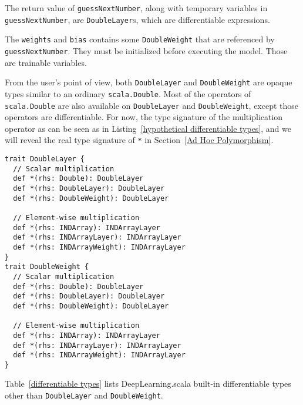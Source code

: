 The return value of \lstinline{guessNextNumber}, along with temporary variables in \lstinline{guessNextNumber}, are \lstinline{DoubleLayer}s, which are \glspl{differentiable expression}.

The \lstinline{weights} and \lstinline{bias} contains some \lstinline{DoubleWeight} that are referenced by \lstinline{guessNextNumber}.
They must be initialized before executing the model. Those are \glspl{trainable variable}.

From the user's point of view, both \lstinline{DoubleLayer} and \lstinline{DoubleWeight} are opaque types similar to an ordinary \lstinline{scala.Double}. Most of the operators of \lstinline{scala.Double} are also available on \lstinline{DoubleLayer}  and \lstinline{DoubleWeight}, except those operators are differentiable. For now, the type signature of the multiplication operator as can be seen as in Listing~\ref{hypothetical differentiable types}, and we will reveal the real type signature of \lstinline{*} in Section~\ref{Ad Hoc Polymorphism}.

\begin{lstlisting}[float={h t b p},caption={The hypothetical type signature of multiplication operator for \lstinline{DoubleLayer} and \lstinline{DoubleWeight}},label={hypothetical differentiable types}]
trait DoubleLayer {
  // Scalar multiplication
  def *(rhs: Double): DoubleLayer
  def *(rhs: DoubleLayer): DoubleLayer
  def *(rhs: DoubleWeight): DoubleLayer

  // Element-wise multiplication
  def *(rhs: INDArray): INDArrayLayer
  def *(rhs: INDArrayLayer): INDArrayLayer
  def *(rhs: INDArrayWeight): INDArrayLayer
}
trait DoubleWeight {
  // Scalar multiplication
  def *(rhs: Double): DoubleLayer
  def *(rhs: DoubleLayer): DoubleLayer
  def *(rhs: DoubleWeight): DoubleLayer

  // Element-wise multiplication
  def *(rhs: INDArray): INDArrayLayer
  def *(rhs: INDArrayLayer): INDArrayLayer
  def *(rhs: INDArrayWeight): INDArrayLayer
}
\end{lstlisting}

Table~\ref{differentiable types} lists DeepLearning.scala built-in differentiable types other than \lstinline{DoubleLayer} and \lstinline{DoubleWeight}.

